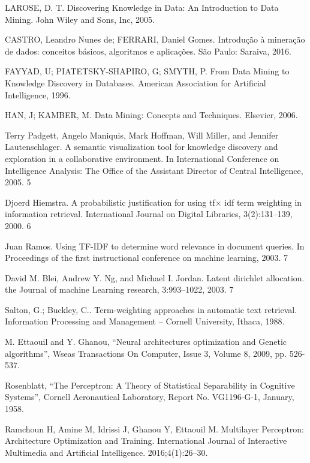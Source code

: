 \documentclass[conference]{IEEEtran}
\begin{document}
\begin{thebibliography}{00}

 LAROSE, D. T. Discovering Knowledge in Data: An Introduction to Data Mining.
John Wiley and Sons, Inc, 2005.

 CASTRO, Leandro Nunes de; FERRARI, Daniel Gomes. Introdução à mineração de
dados: conceitos básicos, algoritmos e aplicações. São Paulo: Saraiva, 2016.

 FAYYAD, U; PIATETSKY-SHAPIRO, G; SMYTH, P. From Data Mining to Knowledge Discovery in Databases. American Association for Artificial Intelligence, 1996.

 HAN, J; KAMBER, M. Data Mining: Concepts and Techniques. Elsevier, 2006.

 Terry Padgett, Angelo Maniquis, Mark Hoffman, Will Miller, and Jennifer Lautenschlager. A semantic visualization tool for knowledge discovery and exploration in a
collaborative environment. In International Conference on Intelligence Analysis: The
Office of the Assistant Director of Central Intelligence, 2005. 5 

 Djoerd Hiemstra. A probabilistic justification for using tf$\times$ idf term weighting
in information retrieval. International Journal on Digital Libraries, 3(2):131–139,
2000. 6

 Juan Ramos. Using TF-IDF to determine word relevance in document queries.
In Proceedings of the first instructional conference on machine learning, 2003. 7

 David M. Blei, Andrew Y. Ng, and Michael I. Jordan. Latent dirichlet allocation.
the Journal of machine Learning research, 3:993–1022, 2003. 7

 Salton, G.; Buckley, C.. Term-weighting approaches in automatic text retrieval.
Information Processing and Management – Cornell University, Ithaca, 1988.

 M. Ettaouil and Y. Ghanou, “Neural architectures optimization and Genetic algorithms”, Wseas Transactions On Computer, Issue 3, Volume 8, 2009, pp. 526-537. 

 Rosenblatt, “The Perceptron: A Theory of Statistical Separability in Cognitive Systems”, Cornell Aeronautical Laboratory, Report No. VG1196-G-1, January, 1958. 

 Ramchoun H, Amine M, Idrissi J, Ghanou Y, Ettaouil M. Multilayer Perceptron: Architecture Optimization and Training. International Journal of Interactive Multimedia and Artificial Intelligence. 2016;4(1):26–30.


\end{thebibliography}
\end{document}
